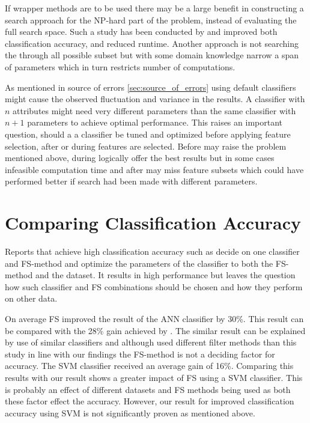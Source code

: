If wrapper methods are to be used there may be a large benefit in constructing a search approach for the NP-hard part of the problem, instead of evaluating the full search space. Such a study has been conducted by \textcite{panthong2015} and improved both classification accuracy, and reduced runtime. Another approach is not searching the through all possible subset but with some domain knowledge narrow a span of parameters which in turn restricts number of computations.

As mentioned in source of errors \ref{sec:source_of_errors} using default classifiers might cause the observed fluctuation and variance in the results. A classifier with $n$ attributes might need very different parameters than the same classifier with $n + 1$ parameters to achieve optimal performance. This raises an important question, should a a classifier be tuned and optimized before applying feature selection, after or during features are selected. Before may raise the problem mentioned above, during logically offer the best results but in some cases infeasible computation time and after may miss feature subsets which could have performed better if search had been made with different parameters.

\section{Comparing Classification Accuracy}

Reports that achieve high classification accuracy such as \textcite{akay2009} decide on one classifier and FS-method and optimize the parameters of the classifier to both the FS-method and the dataset. It results in high performance but leaves the question how such classifier and FS combinations should be chosen and how they perform on other data.

On average FS improved the result of the ANN classifier by 30\%. This result can be compared with the 28\% gain achieved by \textcite{karabulut2012}. The similar result can be explained by use of similar classifiers and although \textcite{karabulut2012} used different filter methods than this study in line with our findings the FS-method is not a deciding factor for accuracy. The SVM classifier received an average gain of 16\%. Comparing this results with \textcite{b20103177} our result shows a greater impact of FS using a SVM classifier. This is probably an effect of different datasets and FS methods being used as both these factor effect the accuracy. However, our result for improved classification accuracy using SVM is not significantly proven as mentioned above.

